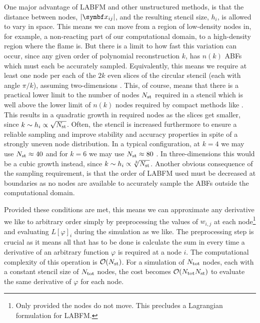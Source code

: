 One major advantage of LABFM and other unstructured methods, is that the distance between nodes, $\abs{\vb{x}_{ij}}$, and the resulting stencil size, $h_i$, is allowed to vary in space. This means we can move from a region of low-density nodes in, for example, a non-reacting part of our computational domain, to a high-density region where the flame is. But there is a limit to how fast this variation can occur, since any given order of polynomial reconstruction $k$, has $n(k)$ ABFs which must each be accurately sampled. Equivalently, this means we require at least one node per each of the $2k$ even slices of the circular stencil (each with angle $\pi / k$), assuming two-dimensions \cite{king2020HighOrderDifference}. This, of course, means that there is a practical lower limit to the number of nodes $N_{\rm{st}}$ required in a stencil which is well above the lower limit of $n(k)$ nodes required by compact methods like \cite{jensen1972FiniteDifferenceTechniques}. This results in a quadratic growth in required nodes as the slices get smaller, since $k \sim h_i \propto \sqrt{N_{\rm{st}}}$. Often, the stencil is increased furthermore to ensure a reliable sampling and improve stability and accuracy properties in spite of a strongly uneven node distribution. In a typical configuration, at $k = 4$ we may use $N_{\rm{st}} \approx 40$ and for $k = 6$ we may use $N_{\rm{st}} \approx 80$ . In three-dimensions this would be a cubic growth instead, since $k \sim h_i \propto \sqrt[3]{N_{\rm{st}}}$. Another obvious consequence of the sampling requirement, is that the order of LABFM used must be decreased at boundaries as no nodes are available to accurately sample the ABFs outside the computational domain.

Provided these conditions are met, this means we can approximate any derivative we like to arbitrary order simply by preprocessing the values of $w_{i, j}$ at each node\footnote{Only provided the nodes do not move. This precludes a Lagrangian formulation for LABFM.} and evaluating $L[φ]_i$ during the simulation as we like. The preprocessing step is crucial as it means all that has to be done is calculate the sum in  every time a derivative of an arbitrary function $φ$ is required at a node $i$. The computational complexity of this operation is $\cl{O}(N_{\rm{st}})$. For a simulation of $N_{\rm{tot}}$ nodes, each with a constant stencil size of $N_{\rm{tot}}$ nodes, the cost becomes $\cl{O}(N_{\rm{tot}} N_{\rm{st}})$ to evaluate the same derivative of $φ$ for each node.



